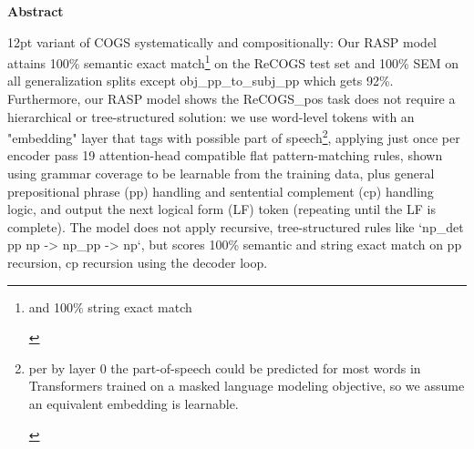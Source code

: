 \documentclass[11pt]{article}
\makeatletter
\renewenvironment{abstract}{\begin{center}\large\textbf{Abstract}\end{center}\begin{list}{}{\setlength{\rightmargin}{0.55cm}\setlength{\leftmargin}{0.55cm}}\item[]\ignorespaces\@setsize\normalsize{12pt}\xpt\@xpt}{\unskip\end{list}}
\makeatother
\begin{document}
\begin{abstract}
\citep{Wu2023} variant of COGS systematically and compositionally: Our RASP model attains 100\% semantic exact match\footnote{\begin{footnotesize}and 100\% string exact match\end{footnotesize}} on the ReCOGS test set and 100\% SEM on all generalization splits except obj\_pp\_to\_subj\_pp which gets 92\%. Furthermore, our RASP model shows the ReCOGS\_pos task does not require a hierarchical or tree-structured solution: we use word-level tokens with an "embedding" layer that tags with possible part of speech\footnote{\begin{footnotesize}per \citep{tenney2019bertrediscoversclassicalnlp} by layer 0 the part-of-speech could be predicted for most words in Transformers trained on a masked language modeling objective, so we assume an equivalent embedding is learnable.\end{footnotesize}}, applying just once per encoder pass 19 attention-head compatible flat pattern-matching rules, shown using grammar coverage \citep{fuzzingbook2023:GrammarCoverageFuzzer} to be learnable from the training data, plus general prepositional phrase (pp) handling and sentential complement (cp) handling logic, and output the next logical form (LF) token (repeating until the LF is complete). The model does not apply recursive, tree-structured rules like `np\_det pp np -> np\_pp -> np`, but scores 100\% semantic and string exact match on pp recursion, cp recursion using the decoder loop.

\end{abstract}
\end{document}
